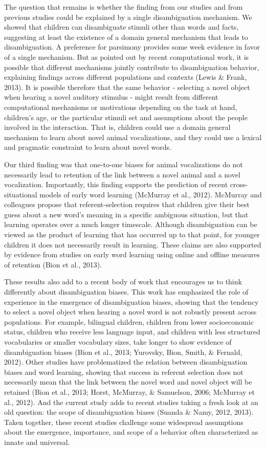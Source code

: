 \documentclass[english,floatsintext,man]{apa6}
\theoremstyle{definition}
\theoremstyle{definition}
\theoremstyle{definition}
\theoremstyle{remark}
\begin{document}
The question that remains is whether the finding from our studies and
from previous studies could be explained by a single disambiguation
mechanism. We showed that children can disambiguate stimuli other than
words and facts, suggesting at least the existence of a domain general
mechanism that leads to disambiguation. A preference for parsimony
provides some week evidence in favor of a single mechanism. But as
pointed out by recent computational work, it is possible that different
mechanisms jointly contribute to disambiguation behavior, explaining
findings across different populations and contexts (Lewis \& Frank,
2013). It is possible therefore that the same behavior - selecting a
novel object when hearing a novel auditory stimulus - might result from
different computational mechanisms or motivations depending on the task
at hand, children's age, or the particular stimuli set and assumptions
about the people involved in the interaction. That is, children could
use a domain general mechanism to learn about novel animal
vocalizations, and they could use a lexical and pragmatic constraint to
learn about novel words.

Our third finding was that one-to-one biases for animal vocalizations do
not necessarily lead to retention of the link between a novel animal and
a novel vocalization. Importantly, this finding supports the prediction
of recent cross-situational models of early word learning (McMurray et
al., 2012). McMurray and colleagues propose that referent-selection
requires that children give their best guess about a new word's meaning
in a specific ambiguous situation, but that learning operates over a
much longer timescale. Although disambiguation can be viewed as the
product of learning that has occurred up to that point, for younger
children it does not necessarily result in learning. These claims are
also supported by evidence from studies on early word learning using
online and offline measures of retention (Bion et al., 2013).

These results also add to a recent body of work that encourages us to
think differently about disambiguation biases. This work has emphasized
the role of experience in the emergence of disambiguation biases,
showing that the tendency to select a novel object when hearing a novel
word is not robustly present across populations. For example, bilingual
children, children from lower socioeconomic status, children who receive
less language input, and children with less structured vocabularies or
smaller vocabulary sizes, take longer to show evidence of disambiguation
biases (Bion et al., 2013; Yurovsky, Bion, Smith, \& Fernald, 2012).
Other studies have problematized the relation between disambiguation
biases and word learning, showing that success in referent selection
does not necessarily mean that the link between the novel word and novel
object will be retained (Bion et al., 2013; Horst, McMurray, \&
Samuelson, 2006; McMurray et al., 2012). And the current study adds to
recent studies taking a fresh look at an old question: the scope of
disambiguation biases (Suanda \& Namy, 2012, 2013). Taken together,
these recent studies challenge some widespread assumptions about the
emergence, importance, and scope of a behavior often characterized as
innate and universal.
\end{document}
